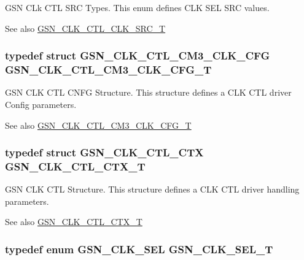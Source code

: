 GSN CLk CTL SRC Types. This enum defines CLK SEL SRC values. 

\begin{DoxySeeAlso}{See also}
\hyperlink{a00644_ga95d23078ba56d33653b82794ca56f5d6}{GSN\_\-CLK\_\-CTL\_\-CLK\_\-SRC\_\-T} 
\end{DoxySeeAlso}
\hypertarget{a00644_ga8a7770f0cdba320f9d6418cc8419b450}{
\subsubsection[{GSN\_\-CLK\_\-CTL\_\-CM3\_\-CLK\_\-CFG\_\-T}]{\setlength{\rightskip}{0pt plus 5cm}typedef struct {\bf GSN\_\-CLK\_\-CTL\_\-CM3\_\-CLK\_\-CFG} {\bf GSN\_\-CLK\_\-CTL\_\-CM3\_\-CLK\_\-CFG\_\-T}}}
\label{a00644_ga8a7770f0cdba320f9d6418cc8419b450}


GSN CLK CTL CNFG Structure. This structure defines a CLK CTL driver Config parameters. 

\begin{DoxySeeAlso}{See also}
\hyperlink{a00644_ga8a7770f0cdba320f9d6418cc8419b450}{GSN\_\-CLK\_\-CTL\_\-CM3\_\-CLK\_\-CFG\_\-T} 
\end{DoxySeeAlso}
\hypertarget{a00644_ga9e7d0d37ecaac3d985e5618e1c8c57d5}{
\subsubsection[{GSN\_\-CLK\_\-CTL\_\-CTX\_\-T}]{\setlength{\rightskip}{0pt plus 5cm}typedef struct {\bf GSN\_\-CLK\_\-CTL\_\-CTX} {\bf GSN\_\-CLK\_\-CTL\_\-CTX\_\-T}}}
\label{a00644_ga9e7d0d37ecaac3d985e5618e1c8c57d5}


GSN CLK CTL Structure. This structure defines a CLK CTL driver handling parameters. 

\begin{DoxySeeAlso}{See also}
\hyperlink{a00644_ga9e7d0d37ecaac3d985e5618e1c8c57d5}{GSN\_\-CLK\_\-CTL\_\-CTX\_\-T} 
\end{DoxySeeAlso}
\hypertarget{a00644_gaf4925c33b2dac850008f7d4463760580}{
\subsubsection[{GSN\_\-CLK\_\-SEL\_\-T}]{\setlength{\rightskip}{0pt plus 5cm}typedef enum {\bf GSN\_\-CLK\_\-SEL} {\bf GSN\_\-CLK\_\-SEL\_\-T}}}
\label{a00644_gaf4925c33b2dac850008f7d4463760580}


